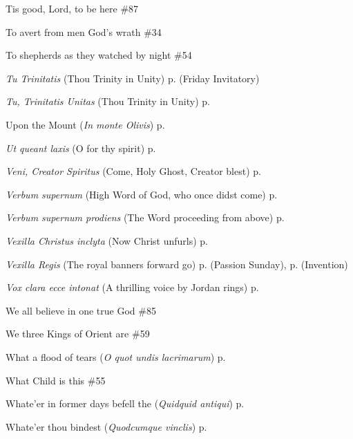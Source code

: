 \begin{hangparas}{1.25em}{1}
\par\noindent
Tis good, Lord, to be here \dotfill \#87
\par\noindent
To avert from men God's wrath \dotfill \#34
\par\noindent
To shepherds as they watched by night \dotfill \#54
\par\noindent
\textit{Tu Trinitatis} (Thou Trinity in Unity) \dotfill p. \pageref{FridayInvitatory} (Friday Invitatory)
\par\noindent
\textit{Tu, Trinitatis Unitas} (Thou Trinity in Unity) \dotfill p. \pageref{TrinityMattins}
\par\noindent
Upon the Mount (\textit{In monte Olivis}) \dotfill p. \pageref{HolyRosaryInvitatory}
\par\noindent
\textit{Ut queant laxis} (O for thy spirit) \dotfill p. \pageref{JohnBaptistEvensong}
\par\noindent
\textit{Veni, Creator Spiritus} (Come, Holy Ghost, Creator blest) \dotfill p. \pageref{WhitsundayEvensong}
\par\noindent
\textit{Verbum supernum} (High Word of God, who once didst come) \dotfill p. \pageref{FirstAdventInvitatory}
\par\noindent
\textit{Verbum supernum prodiens} (The Word proceeding from above) \dotfill p. \pageref{CorpusChristiMattins}
\par\noindent
\textit{Vexilla Christus inclyta} (Now Christ unfurls) \dotfill p. \pageref{ChristTheKingMattins}
\par\noindent
\textit{Vexilla Regis} (The royal banners forward go) \dotfill p. \pageref{PassionSundayEvensong} (Passion Sunday), p. \pageref{InventionEvensong} (Invention)
\par\noindent
\textit{Vox clara ecce intonat} (A thrilling voice by Jordan rings) \dotfill p. \pageref{FirstAdventMattins}
\par\noindent
We all believe in one true God \dotfill \#85
\par\noindent
We three Kings of Orient are \dotfill \#59
\par\noindent
What a flood of tears (\textit{O quot undis lacrimarum}) \dotfill p. \pageref{SevenSorrowsInvitatory}
\par\noindent
What Child is this \dotfill \#55
\par\noindent
Whate'er in former days befell the (\textit{Quidquid antiqui}) \dotfill p. \pageref{BenedictInvitatory}
\par\noindent
Whate'er thou bindest (\textit{Quodcumque vinclis}) \dotfill p. \pageref{LammasInvitatory}

\end{hangparas}

